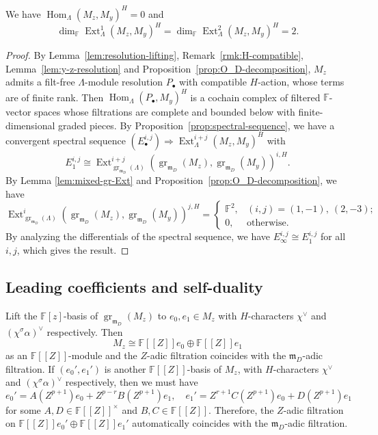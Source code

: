 \documentclass[11pt,a4paper]{article} %
\def\FF{\mathbb{F}}
\def\dim{\operatorname{dim}}
\def\Ext{\operatorname{Ext}} %
\def\gr{\operatorname{gr}}
\def\Hom{\operatorname{Hom}}
\begin{document}
\begin{proposition}\label{prop:mixed-ext-dim}
    We have $\Hom_{\Lambda}(M_z,M_y)^H=0$ and 
    \[
    \dim_\FF \Ext^1_{\Lambda}(M_z,M_y)^H=\dim_\FF \Ext^2_{\Lambda}(M_z,M_y)^H=2.
    \]
\end{proposition}
\begin{proof}
    By Lemma~\ref{lem:resolution-lifting}, Remark~\ref{rmk:H-compatible}, Lemma~\ref{lem:y-z-resolution} and Proposition~\ref{prop:O_D-decomposition}, $M_z$ admits a filt-free $\Lambda$-module resolution $P_{\bullet}$ with compatible $H$-action, whose terms are of finite rank. Then $\Hom_{\Lambda}(P_{\bullet},M_y)^H$ is a cochain complex of filtered $\FF$-vector spaces whose filtrations are complete and bounded below with finite-dimensional graded pieces. By Proposition~\ref{prop:spectral-sequence}, we have a convergent spectral sequence $(E_\bullet^{i,j})\Longrightarrow\Ext^{i+j}_{\Lambda}(M_z,M_y)^H$ with 
    \[
    E_1^{i,j}\cong\Ext_{\gr_{\mathfrak{m}_D}(\Lambda)}^{i+j}\left(\gr_{\mathfrak{m}_D}(M_z),\gr_{\mathfrak{m}_D}(M_y)\right)^{i,H}.
    \]
    By Lemma \ref{lem:mixed-gr-Ext} and Proposition~\ref{prop:O_D-decomposition}, we have
    \[
    \Ext_{\gr_{\mathfrak{m}_D}(\Lambda)}^i\left(\gr_{\mathfrak{m}_D}(M_z),\gr_{\mathfrak{m}_D}(M_y)\right)^{j,H}=
    \begin{cases}
         \FF^2,&(i,j)=(1,-1),~(2,-3);\\
             0,&\text{otherwise}.     
    \end{cases}
    \]
    By analyzing the differentials of the spectral sequence, we have $E_{\infty}^{i,j}\cong E_1^{i,j}$ for all $i,j$, which gives the result.
\end{proof}

\subsection{Leading coefficients and self-duality}

Lift the $\FF[z]$-basis of $\gr_{\mathfrak{m}_D}(M_z)$ to $e_0,e_1\in M_z$ with $H$-characters $\chi^\vee$ and $(\chi^\sigma\alpha)^\vee$ respectively. Then 
\[
M_z\cong\FF[[Z]]e_0\oplus\FF[[Z]]e_1
\]
as an $\FF[[Z]]$-module and the $Z$-adic filtration coincides with the $\mathfrak{m}_D$-adic filtration. If $(e_0',e_1')$ is another $\FF[[Z]]$-basis of $M_z$, with $H$-characters $\chi^\vee$ and $(\chi^\sigma\alpha)^\vee$ respectively, then we must have
\begin{equation}\label{eq:base-change}
     e_0'=A(Z^{p+1})e_0+Z^{p-r}B(Z^{p+1})e_1,\quad e_1'=Z^{r+1}C(Z^{p+1})e_0+D(Z^{p+1})e_1
\end{equation}
for some $A,D\in\FF[[Z]]^{\times}$ and $B,C\in\FF[[Z]]$. Therefore, the $Z$-adic filtration on $\FF[[Z]]e_0'\oplus\FF[[Z]]e_1'$ automatically coincides with the $\mathfrak{m}_D$-adic filtration.
\end{document}
